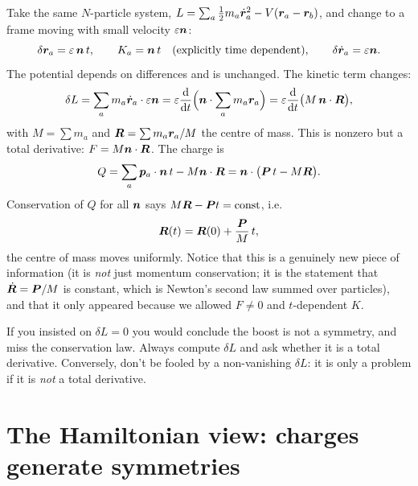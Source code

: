 \documentclass[11pt]{article}
\newcommand{\eps}{\varepsilon}
\begin{document}
\begin{example}\label{ex:boost}
Take the same $N$-particle system, $L=\sum_a\tfrac12m_a\dot{\bm{r}}_a^2-V(\bm{r}_a-\bm{r}_b)$, and change to a frame moving with small velocity $\eps\vect n$:
\begin{equation}
  \delta\vect r_a=\eps\,\vect n\,t,\qquad K_a=\vect n\,t\quad(\text{explicitly time dependent}),\qquad \delta\dot{\vect r}_a=\eps\vect n .
\end{equation}
The potential depends on differences and is unchanged. The kinetic term changes:
\begin{equation}
  \delta L=\sum_am_a\dot{\vect r}_a\cdot\eps\vect n=\eps\diff{}{t}\Big(\vect n\cdot\sum_am_a\vect r_a\Big)=\eps\diff{}{t}\big(M\,\vect n\cdot\vect R\big),
\end{equation}
with $M=\sum m_a$ and $\bm{R}=\sum m_a\bm{r}_a/M$ the centre of mass. This is nonzero but a total derivative: $F=M\bm{n}\cdot\bm{R}$. The charge is
\begin{equation}
  Q=\sum_a\bm{p}_a\cdot\bm{n}\,t-M\bm{n}\cdot\bm{R}=\bm{n}\cdot\big(\bm{P}\,t-M\bm{R}\big).
\end{equation}
Conservation of $Q$ for all $\bm{n}$ says $M\bm{R}-\bm{P}t=\text{const}$, i.e.\
\begin{equation}
  \bm{R}(t)=\bm{R}(0)+\frac{\bm{P}}{M}\,t,
\end{equation}
the centre of mass moves uniformly. Notice that this is a genuinely new piece of information (it is \emph{not} just momentum conservation; it is the statement that $\dot{\bm{R}}=\bm{P}/M$ is constant, which is Newton's second law summed over particles), and that it only appeared because we allowed $F\ne0$ and $t$-dependent $K$.
\end{example}

\begin{pitfall}[Forgetting $F$]
If you insisted on $\delta L=0$ you would conclude the boost is not a symmetry, and miss the conservation law. Always compute $\delta L$ and ask whether it is a total derivative. Conversely, don't be fooled by a non-vanishing $\delta L$: it is only a problem if it is \emph{not} a total derivative.
\end{pitfall}

\section{The Hamiltonian view: charges generate symmetries}
\end{document}
